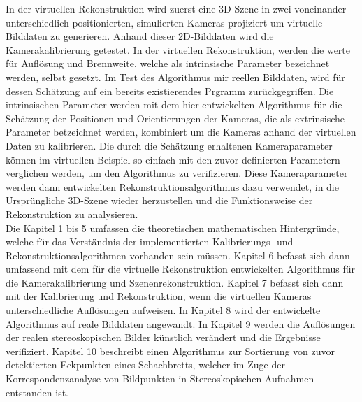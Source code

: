 In der virtuellen Rekonstruktion wird zuerst eine 3D Szene in zwei voneinander unterschiedlich positionierten, simulierten Kameras projiziert um virtuelle Bilddaten zu generieren. Anhand dieser 2D-Bilddaten wird die Kamerakalibrierung getestet. In der virtuellen Rekonstruktion, werden die werte für Auflösung und Brennweite, welche als intrinsische Parameter bezeichnet werden, selbst gesetzt. Im Test des Algorithmus mir reellen Bilddaten, wird für dessen Schätzung auf ein bereits existierendes Prgramm zurückgegriffen. Die intrinsischen Parameter werden mit dem hier entwickelten Algorithmus für die Schätzung der Positionen und Orientierungen der Kameras, die als extrinsische Parameter betzeichnet werden, kombiniert um die Kameras anhand der virtuellen Daten zu kalibrieren. Die durch die Schätzung erhaltenen Kameraparameter können im virtuellen Beispiel so einfach mit den zuvor definierten Parametern verglichen werden, um den Algorithmus zu verifizieren. Diese Kameraparameter werden dann entwickelten Rekonstruktionsalgorithmus dazu verwendet, in die Ursprüngliche 3D-Szene wieder herzustellen und die Funktionsweise der Rekonstruktion zu analysieren. \\

Die Kapitel 1 bis 5 umfassen die theoretischen mathematischen Hintergründe, welche für das Verständnis der implementierten Kalibrierungs- und Rekonstruktionsalgorithmen vorhanden sein müssen. Kapitel 6 befasst sich dann umfassend mit dem für die virtuelle Rekonstruktion entwickelten Algorithmus für die Kamerakalibrierung und Szenenrekonstruktion. Kapitel 7 befasst sich dann mit der Kalibrierung und Rekonstruktion, wenn die virtuellen Kameras unterschiedliche Auflösungen aufweisen. In Kapitel 8 wird der entwickelte Algorithmus auf reale Bilddaten angewandt. In Kapitel 9 werden die Auflösungen der realen stereoskopischen Bilder künstlich verändert und die Ergebnisse verifiziert. Kapitel 10 beschreibt einen Algorithmus zur Sortierung von zuvor detektierten Eckpunkten eines Schachbretts, welcher im Zuge der Korrespondenzanalyse von Bildpunkten in Stereoskopischen Aufnahmen entstanden ist.

